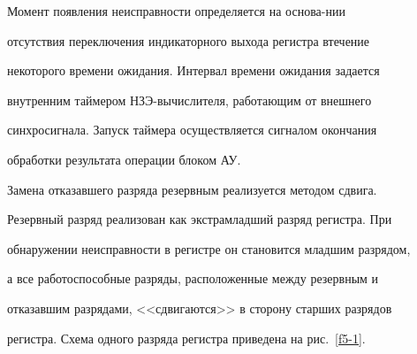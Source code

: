    Момент появления неисправности определяется на основа-\linebreak нии


отсутствия переключения индикаторного выхода регистра в\linebreak течение


некоторого времени ожидания. Интервал времени ожидания задается


внутренним таймером НЗЭ-вы\-чис\-ли\-те\-ля, работающим от внешнего


синхросигнала. Запуск таймера осуществляется сигналом окончания


обработки результата операции блоком АУ.





   Замена отказавшего разряда резервным реализуется методом сдвига.


Резервный разряд реализован как экст\-ра\-млад\-ший разряд регистра. При


обнаружении неисправности в регистре он становится младшим разрядом,


а все работоспособные разряды, расположенные между резервным и


отказавшим разрядами, <<сдвигаются>> в сторону старших разрядов


ре\-гист\-ра. Схе\-ма одного разряда регистра приведена на  рис.~\ref{f5-1}.
































